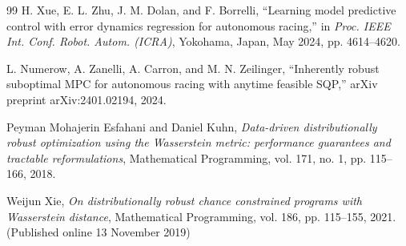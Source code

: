 \documentclass[pdflatex,sn-mathphys,Numbered]{sn-jnl}
\numberwithin{equation}{section}
\begin{document}
\begin{thebibliography}{99}
		H. Xue, E. L. Zhu, J. M. Dolan, and F. Borrelli,
		``Learning model predictive control with error dynamics regression for autonomous racing,''
		in \textit{Proc. IEEE Int. Conf. Robot. Autom. (ICRA)}, Yokohama, Japan, May 2024, pp. 4614--4620.
		
		L. Numerow, A. Zanelli, A. Carron, and M. N. Zeilinger,
		``Inherently robust suboptimal MPC for autonomous racing with anytime feasible SQP,''
		arXiv preprint arXiv:2401.02194, 2024.

		Peyman Mohajerin Esfahani and Daniel Kuhn,
		\emph{Data-driven distributionally robust optimization using the Wasserstein metric: performance guarantees and tractable reformulations},
		Mathematical Programming, vol. 171, no. 1, pp. 115–166, 2018.

		Weijun Xie,
		\emph{On distributionally robust chance constrained programs with Wasserstein distance},
		Mathematical Programming, vol. 186, pp. 115–155, 2021.
		(Published online 13 November 2019)
		
	\end{thebibliography}
	
\end{document}
